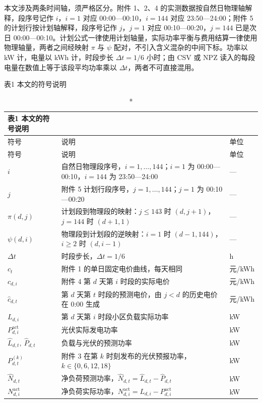 \documentclass[12pt,a4paper]{ctexart}
\begin{document}
本文涉及两条时间轴，须严格区分。附件 1、2、4 的实测数据按自然日物理轴解释，段序号记作 $i$，$i=1$ 对应 00:00—00:10，$i=144$ 对应 23:50—24:00；附件 5 的计划行按计划轴解释，段序号记作 $j$，$j=1$ 对应 00:10—00:20，$j=144$ 已是次日 00:00—00:10。计划公式一律使用计划轴量，实际功率平衡与费用结算一律使用物理轴量，两者之间经映射 $\pi$ 与 $\psi$ 配对，不引入含义混杂的中间下标。功率以 kW 计，电量以 kWh 计，时段步长 $\Delta t=1/6$ 小时；由 CSV 或 NPZ 读入的每段电量在数值上等于该段平均功率乘以 $\Delta t$，两者不可直接混用。

表1 本文的符号说明

\begin{longtable}{C{0.24\textwidth}C{0.38\textwidth}C{0.38\textwidth}}
\caption*{表1 本文的符号说明}\\
\toprule
符号 & 说明 & 单位 \\
\midrule
\endfirsthead
\toprule
符号 & 说明 & 单位 \\
\midrule
\endhead
$i$ & 自然日物理段序号，$i=1,\dots,144$；$i=1$ 为 00:00—00:10，$i=144$ 为 23:50—24:00 & — \\
$j$ & 附件 5 计划行段序号，$j=1,\dots,144$；$j=1$ 为 00:10—00:20 & — \\
$\pi(d,j)$ & 计划段到物理段的映射：$j\le 143$ 时 $(d,j+1)$，$j=144$ 时 $(d+1,1)$ & — \\
$\psi(d,i)$ & 物理段到计划段的逆映射：$i=1$ 时 $(d-1,144)$，$i\ge2$ 时 $(d,i-1)$ & — \\
$\Delta t$ & 时段步长，$\Delta t=1/6$ & h \\
$c_t$ & 附件 1 的单日固定电价曲线，每天相同 & 元/kWh \\
$c_{d,i}$ & 附件 4 第 $d$ 天第 $i$ 时段的实际电价 & 元/kWh \\
$\widehat{c}_{d,t}$ & 第 $d$ 天第 $t$ 时段的预测电价，由 $j<d$ 的历史电价在 0:00 生成 & 元/kWh \\
$L_{d,i}$ & 第 $d$ 天第 $i$ 时段小区负载实际功率 & kW \\
$P_{d,i}^{\mathrm{act}}$ & 光伏实际发电功率 & kW \\
$\widehat{L}_{d,t},\ \widehat{P}_{d,t}$ & 负载与光伏的预测功率 & kW \\
$P_{d,t}^{(k)}$ & 附件 3 在第 $k$ 时刻发布的光伏预报功率，$k\in\{0,6,12,18\}$ & kW \\
$\widehat{N}_{d,t}$ & 净负荷预测功率，$\widehat{N}_{d,t}=\widehat{L}_{d,t}-\widehat{P}_{d,t}$ & kW \\
$N_{d,i}^{\mathrm{act}}$ & 净负荷实际功率，$N_{d,i}^{\mathrm{act}}=L_{d,i}-P_{d,i}^{\mathrm{act}}$ & kW \\

\end{longtable}
\end{document}
